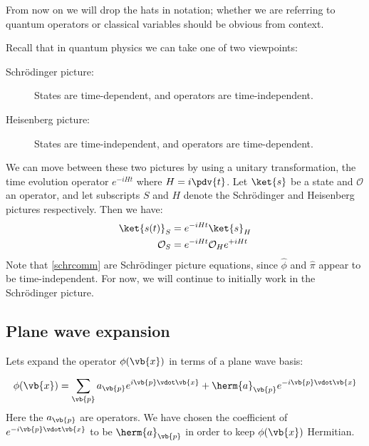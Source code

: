\documentclass{jknotes} %
\begin{document}
From now on we will drop the hats in notation; whether we are referring to quantum operators or classical variables should be obvious from context.

Recall that in quantum physics we can take one of two viewpoints:
\begin{description}
    \item[Schr\"odinger picture:] States are time-dependent, and operators are time-independent.
    \item[Heisenberg picture:] States are time-independent, and operators are time-dependent.
\end{description}
We can move between these two pictures by using a unitary transformation, the time evolution operator \(e^{-iHt}\) where \(H = i \pdv{t}\). Let \(\ket{s}\) be a state and \(\mathcal{O}\) an operator, and let subscripts \(S\) and \(H\) denote the Schr\"odinger and Heisenberg pictures respectively. Then we have:
\begin{align}
    \ket{s(t)}_S &= e^{-iHt} \ket{s}_H \\
    \mathcal{O}_S &= e^{-iHt} \mathcal{O}_H e^{+iHt}
\end{align}
Note that \eqref{schrcomm} are Schr\"odinger picture equations, since \(\hat\phi\) and \(\hat\pi\) appear to be time-independent. For now, we will continue to initially work in the Schr\"odinger picture.

\subsection{Plane wave expansion}
Lets expand the operator \(\phi(\vb{x})\) in terms of a plane wave basis:

\begin{equation}
    \phi(\vb{x}) = \sum_{\vb{p}} a_{\vb{p}} e^{i\vb{p}\vdot\vb{x}} + \herm{a}_{\vb{p}} e^{-i\vb{p}\vdot\vb{x}}
\end{equation}
Here the \(a_{\vb{p}}\) are operators. We have chosen the coefficient of \(e^{-i\vb{p}\vdot\vb{x}}\) to be \(\herm{a}_{\vb{p}}\) in order to keep \(\phi(\vb{x})\) Hermitian.
\end{document}

